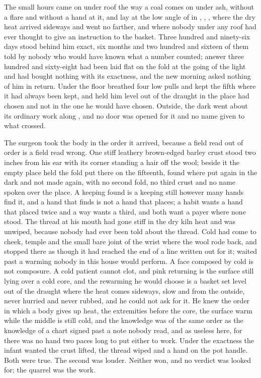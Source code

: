 
The small hours came on under  roof the way a coal comes on under ash, without a flare and without a hand at it, and  lay at the low angle of  in , , , where the dry heat arrived sideways and went no farther, and where nobody under any roof had ever thought to give an instruction to the basket. Three hundred and ninety-six days stood behind him exact, six months and two hundred and sixteen of them told by nobody who would have known what a number counted; answer three hundred and sixty-eight had been laid flat on the fold at the going of the light and had bought nothing with its exactness, and the new morning asked nothing of him in return. Under the floor  breathed four low pulls and kept the fifth where it had always been kept, and  held him level out of the draught in the place  had chosen and not in the one he would have chosen. Outside, the dark went about its ordinary work along , and no door was opened for it and no name given to what crossed.

The surgeon took the body in the order it arrived, because a field read out of order is a field read wrong. One stiff leathery brown-edged barley crust stood two inches from his ear with its corner standing a hair off the wool; beside it the empty place held the fold put there on the fifteenth, found where put again in the dark and not made again, with no second fold, no third crust and no name spoken over the place. A keeping found is a keeping still however many hands find it, and a hand that finds is not a hand that places; a habit wants a hand that placed twice and a way wants a third, and both want a payer where none stood. The thread at his mouth had gone stiff in the dry kiln heat and was unwiped, because nobody had ever been told about the thread. Cold had come to cheek, temple and the small bare joint of the wrist where the wool rode back, and stopped there as though it had reached the end of a line written out for it;  waited past a warming nobody in this house would perform. A face composed by cold is not composure. A cold patient cannot clot, and pink returning is the surface still lying over a cold core, and the rewarming he would choose is a basket set level out of the draught where the heat comes sideways, slow and from the outside, never hurried and never rubbed, and he could not ask for it. He knew the order in which a body gives up heat, the extremities before the core, the surface warm while the middle is still cold, and the knowledge was of the same order as the knowledge of a chart signed past a note nobody read, and as useless here, for there was no hand two paces long to put either to work. Under the exactness the infant wanted the crust lifted, the thread wiped and a hand on the pot handle. Both were true. The second was louder. Neither won, and no verdict was looked for; the quarrel was the work.


